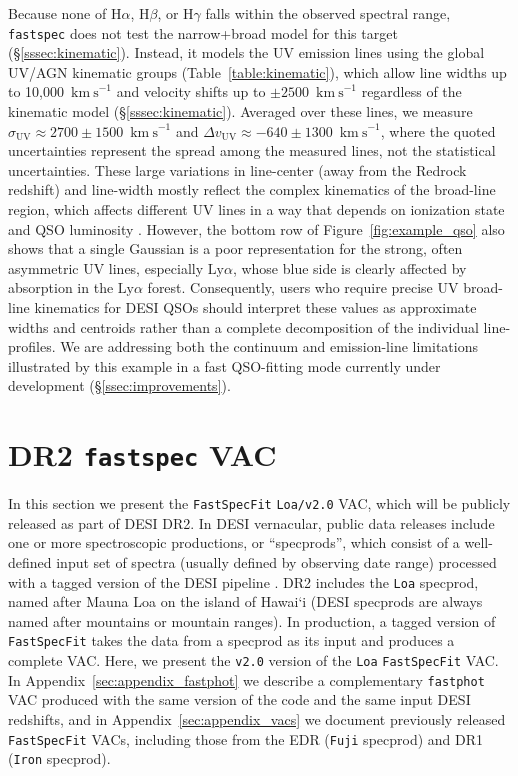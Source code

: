 \documentclass[modern,linenumbers]{aastex702}
\newcommand{\fastspecfit}{\texttt{FastSpecFit}}
\newcommand{\fastspec}{\texttt{fastspec}}
\newcommand{\fastphot}{\texttt{fastphot}}
\newcommand{\kms}{\ensuremath{\mathrm{km~s}^{-1}}}
\newcommand{\ha}{\ensuremath{\mathrm{H}\alpha}}
\newcommand{\hb}{\ensuremath{\mathrm{H}\beta}}
\newcommand{\hg}{\ensuremath{\mathrm{H}\gamma}}
\newcommand{\lya}{\ensuremath{\mathrm{Ly}\alpha}}
\begin{document}
Because none of \ha, \hb, or \hg{} falls within the observed spectral
range, \fastspec{} does not test the narrow+broad model for this
target (\S\ref{sssec:kinematic}). Instead, it models the UV emission
lines using the global UV/AGN kinematic groups
(Table~\ref{table:kinematic}), which allow line widths up to
10,000~\kms{} and velocity shifts up to $\pm2500$~\kms{} regardless of
the kinematic model (\S\ref{sssec:kinematic}). Averaged over these
lines, we measure $\sigma_\mathrm{UV}\approx2700\pm1500$~\kms{} and
$\Delta v_\mathrm{UV}\approx-640\pm1300$~\kms, where the quoted
uncertainties represent the spread among the measured lines, not the
statistical uncertainties. These large variations in line-center (away
from the Redrock redshift) and line-width mostly reflect the complex
kinematics of the broad-line region, which affects different UV lines
in a way that depends on ionization state and QSO luminosity
\citep[e.g.,][]{shen16a}. However, the bottom row of
Figure~\ref{fig:example_qso} also shows that a single Gaussian is a
poor representation for the strong, often asymmetric UV lines,
especially \lya, whose blue side is clearly affected by absorption in
the \lya{} forest. Consequently, users who require precise UV
broad-line kinematics for DESI QSOs should interpret these values as
approximate widths and centroids rather than a complete decomposition
of the individual line-profiles. We are addressing both the continuum
and emission-line limitations illustrated by this example in a fast
QSO-fitting mode currently under development
(\S\ref{ssec:improvements}).

\section{DR2 \fastspec{} VAC}
\label{sec:vac}

In this section we present the \fastspecfit{} \texttt{Loa/v2.0} VAC,
which will be publicly released as part of DESI DR2. In DESI
vernacular, public data releases include one or more spectroscopic
productions, or ``specprods'', which consist of a well-defined input
set of spectra (usually defined by observing date range) processed
with a tagged version of the DESI pipeline
\citep{desi-collaboration26a}. DR2 includes the \texttt{Loa} specprod,
named after Mauna Loa on the island of Hawai`i (DESI specprods are
always named after mountains or mountain ranges). In production, a
tagged version of \fastspecfit{} takes the data from a specprod as its
input and produces a complete VAC. Here, we present the \texttt{v2.0}
version of the \texttt{Loa} \fastspecfit{} VAC. In
Appendix~\ref{sec:appendix_fastphot} we describe a complementary
\fastphot{} VAC produced with the same version of the code and the
same input DESI redshifts, and in Appendix~\ref{sec:appendix_vacs} we
document previously released \fastspecfit{} VACs, including those from
the EDR (\texttt{Fuji} specprod) and DR1 (\texttt{Iron} specprod).
\end{document}
